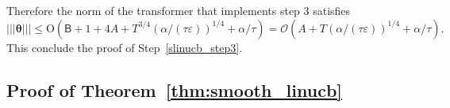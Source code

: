 \documentclass[10pt]{article}
\newcommand{\eps}{\varepsilon}
\renewcommand{\cO}{\mathcal{O}}
\newcommand{\<}{\left\langle}
\renewcommand{\>}{\right\rangle}
\newcommand{\nrmp}[1]{{\left|\!\left|\!\left|{#1}\right|\!\right|\!\right|}}
\newcommand{\temp}{{\tau}}
\newcommand{\cwid}{{\alpha}}
\newcommand{\tfthres}{{\mathsf{B}}}
\newcommand{\conO}{{\mathrm{O}}}
\def\btheta{{\boldsymbol \theta}}
\begin{document}
 Therefore the norm of the transformer that implements step 3 satisfies $$
 \nrmp{\btheta}\leq \conO(\tfthres+1+4A+T^{3/4}({\alpha/(\temp\eps)})^{1/4}+\cwid/\temp)=
 \cO(A+T({\alpha/(\temp\eps)})^{1/4}+\alpha/\temp).$$  This conclude the proof of Step~\ref{slinucb_step3}. 


















































\subsection{Proof of Theorem~\ref{thm:smooth_linucb}}\label{sec:pf_thm:smooth_linucb}
\end{document}
